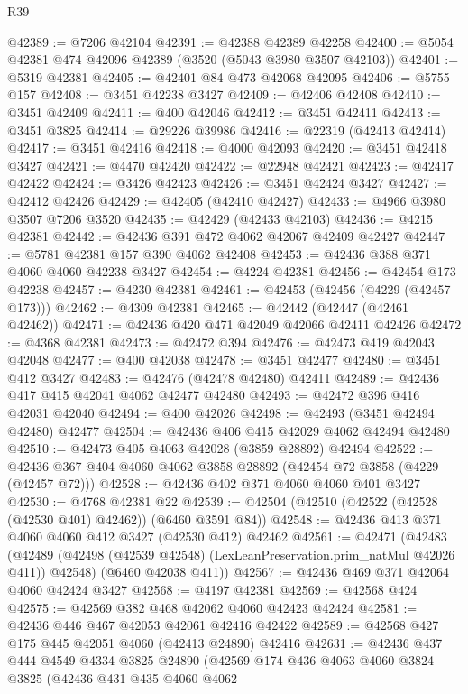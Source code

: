 \begin{lexlean}{R39}
\begin{coremodule}
@42389 := @7206 @42104
@42391 := @42388 @42389 @42258
@42400 := @5054 @42381 @474 @42096 @42389 (@3520 (@5043 @3980 @3507 @42103))
@42401 := @5319 @42381
@42405 := @42401 @84 @473 @42068 @42095
@42406 := @5755 @157
@42408 := @3451 @42238 @3427
@42409 := @42406 @42408
@42410 := @3451 @42409
@42411 := @400 @42046
@42412 := @3451 @42411
@42413 := @3451 @3825
@42414 := @29226 @39986
@42416 := @22319 (@42413 @42414)
@42417 := @3451 @42416
@42418 := @4000 @42093
@42420 := @3451 @42418 @3427
@42421 := @4470 @42420
@42422 := @22948 @42421
@42423 := @42417 @42422
@42424 := @3426 @42423
@42426 := @3451 @42424 @3427
@42427 := @42412 @42426
@42429 := @42405 (@42410 @42427)
@42433 := @4966 @3980 @3507 @7206 @3520
@42435 := @42429 (@42433 @42103)
@42436 := @4215 @42381
@42442 := @42436 @391 @472 @4062 @42067 @42409 @42427
@42447 := @5781 @42381 @157 @390 @4062 @42408
@42453 := @42436 @388 @371 @4060 @4060 @42238 @3427
@42454 := @4224 @42381
@42456 := @42454 @173 @42238
@42457 := @4230 @42381
@42461 := @42453 (@42456 (@4229 (@42457 @173)))
@42462 := @4309 @42381
@42465 := @42442 (@42447 (@42461 @42462))
@42471 := @42436 @420 @471 @42049 @42066 @42411 @42426
@42472 := @4368 @42381
@42473 := @42472 @394
@42476 := @42473 @419 @42043 @42048
@42477 := @400 @42038
@42478 := @3451 @42477
@42480 := @3451 @412 @3427
@42483 := @42476 (@42478 @42480) @42411
@42489 := @42436 @417 @415 @42041 @4062 @42477 @42480
@42493 := @42472 @396 @416 @42031 @42040
@42494 := @400 @42026
@42498 := @42493 (@3451 @42494 @42480) @42477
@42504 := @42436 @406 @415 @42029 @4062 @42494 @42480
@42510 := @42473 @405 @4063 @42028 (@3859 @28892) @42494
@42522 := @42436 @367 @404 @4060 @4062 @3858 @28892 (@42454 @72 @3858 (@4229 (@42457 @72)))
@42528 := @42436 @402 @371 @4060 @4060 @401 @3427
@42530 := @4768 @42381 @22
@42539 := @42504 (@42510 (@42522 (@42528 (@42530 @401) @42462)) (@6460 @3591 @84))
@42548 := @42436 @413 @371 @4060 @4060 @412 @3427 (@42530 @412) @42462
@42561 := @42471
    (@42483
      (@42489 (@42498 (@42539 @42548) (LexLeanPreservation.prim_natMul @42026 @411)) @42548)
      (@6460 @42038 @411))
@42567 := @42436 @469 @371 @42064 @4060 @42424 @3427
@42568 := @4197 @42381
@42569 := @42568 @424
@42575 := @42569 @382 @468 @42062 @4060 @42423 @42424
@42581 := @42436 @446 @467 @42053 @42061 @42416 @42422
@42589 := @42568 @427 @175 @445 @42051 @4060 (@42413 @24890) @42416
@42631 := @42436
    @437
    @444
    @4549
    @4334
    @3825
    @24890
    (@42569
      @174
      @436
      @4063
      @4060
      @3824
      @3825
      (@42436
        @431
        @435
        @4060
        @4062

\end{coremodule}
\end{lexlean}
